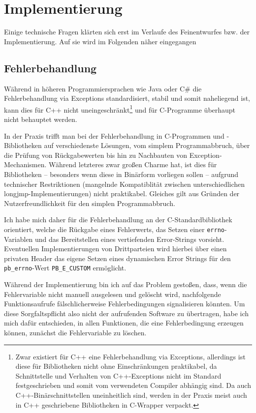 \section{Implementierung}
Einige technische Fragen klärten sich erst im Verlaufe des Feinentwurfes bzw. der Implementierung.
Auf sie wird im Folgenden näher eingegangen

\subsection{Fehlerbehandlung}
Während in höheren Programmiersprachen wie Java oder C\# die Fehlerbehandlung via Exceptions standardisiert, stabil
und somit naheliegend ist, kann dies für C++ nicht uneingeschränkt\footnote{Zwar existiert für C++ eine Fehlerbehandlung
via Exceptions, allerdings ist diese für Bibliotheken nicht ohne Einschränkungen praktikabel, da Schnittstelle und
Verhalten von C++-Exceptions nicht im Standard festgeschrieben und somit vom verwendeten Compiler abhängig sind.
Da auch C++-Binärschnittstellen uneinheitlich sind, werden in der Praxis meist auch in C++ geschriebene
Bibliotheken in C-Wrapper verpackt.} und für C-Programme überhaupt nicht behauptet werden.

In der Praxis trifft man bei der Fehlerbehandlung in C-Programmen und -Bibliotheken auf verschiedenste Lösungen, vom
simplem Programmabbruch, über die Prüfung von Rückgabewerten bis hin zu Nachbauten von Exception-Mechanismen.
Während letzteres zwar großen Charme hat, ist dies für Bibliotheken -- besonders wenn diese in Binärform vorliegen
sollen -- aufgrund technischer Restriktionen (mangelnde Kompatiblität zwischen unterschiedlichen
longjmp-Implementierungen) nicht praktikabel. Gleiches gilt aus Gründen der Nutzerfreundlichkeit für den simplen
Programmabbruch.

Ich habe mich daher für die Fehlerbehandlung an der C-Standardbibliothek orientiert, welche die Rückgabe eines
Fehlerwerts, das Setzen einer \lstinline{errno}-Variablen und das Bereitstellen eines vertiefenden Error-Strings vorsieht.
Eventuellen Implementierungen von Drittparteien wird hierbei über einen privaten Header das eigene Setzen eines
dynamischen Error Strings für den \lstinline{pb_errno}-Wert \lstinline{PB_E_CUSTOM} ermöglicht.

Während der Implementierung bin ich auf das Problem gestoßen, dass, wenn die Fehlervariable nicht manuell ausgelesen und
gelöscht wird, nachfolgende Funktionsaufrufe fälschlicherweise Fehlerbedingungen signalisieren könnten. Um diese
Sorgfaltspflicht also nicht der aufrufenden Software zu übertragen, habe ich mich dafür entschieden, in allen Funktionen,
die eine Fehlerbedingung erzeugen können, zunächst die Fehlervariable zu löschen.

